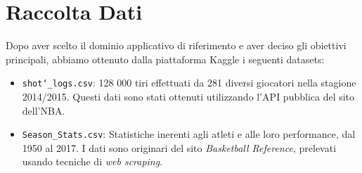 \chapter{Raccolta Dati}

Dopo aver scelto il dominio applicativo di riferimento e aver deciso gli obiettivi principali, abbiamo ottenuto dalla piattaforma Kaggle i seguenti datasets:

\begin{itemize}
\item \texttt{shot\char`_logs.csv}: 128 000 tiri effettuati da 281 diversi giocatori nella stagione 2014/2015. Questi dati sono stati ottenuti utilizzando l'API pubblica del sito dell'NBA.
\item \texttt{Season\_Stats.csv}: Statistiche inerenti agli atleti e alle loro performance, dal 1950 al 2017. I dati sono originari del sito \textit{Basketball Reference}, prelevati usando tecniche di \textit{web scraping}.
\end{itemize}
